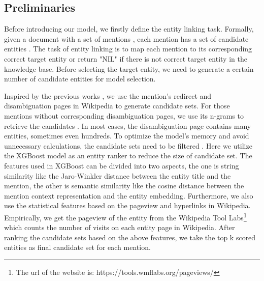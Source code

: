 \documentclass[sigconf]{acmart}
\begin{document}
\subsection{Preliminaries}
Before introducing our model, we firstly define the entity linking task. Formally, given a document  with a set of mentions , each mention  has a set of candidate entities . The task of entity linking is to map each mention  to its corresponding correct target entity  or return "NIL" if there is not correct target entity in the knowledge base. Before selecting the target entity, we need to generate a certain number of candidate entities for model selection.

Inspired by the previous works \cite{PappuBMST17, ZwicklbauerSG16, PhanSTHL17}, we use the mention's redirect and disambiguation pages in Wikipedia to generate candidate sets. For those mentions without corresponding disambiguation pages, we use its n-grams to retrieve the candidates \cite{PhanSTHL17}. In most cases, the disambiguation page contains many entities, sometimes even hundreds. To optimize the model's memory and avoid unnecessary calculations, the candidate sets need to be filtered \cite{0002HLL18, GaneaH17, TitovL18a}. Here we utilize the XGBoost model \cite{ChenG16} as an entity ranker to reduce the size of candidate set. The features used in XGBoost can be divided into two aspects, the one is string similarity like the Jaro-Winkler distance between the entity title and the mention, the other is semantic similarity like the cosine distance between the mention context representation and the entity embedding. Furthermore, we also use the statistical features based on the pageview and hyperlinks in Wikipedia. Empirically, we get the pageview of the entity from the Wikipedia Tool Labs\footnote{The url of the website is: https://tools.wmflabs.org/pageviews/} which counts the number of visits on each entity page in Wikipedia. After ranking the candidate sets based on the above features, we take the top k scored entities as final candidate set for each mention.
\end{document}
